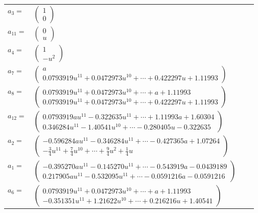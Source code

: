 \documentclass[1p]{elsarticle_modified}
\theoremstyle{definition}
\begin{document}
\begin{tabular}{m{7pt} m{180pt} m{7pt} m{180pt} }
\flushright $a_{3}=$&$\begin{pmatrix}1\\0\end{pmatrix}$ \\
\flushright $a_{11}=$&$\begin{pmatrix}0\\u\end{pmatrix}$ \\
\flushright $a_{4}=$&$\begin{pmatrix}1\\- u^2\end{pmatrix}$ \\
\flushright $a_{7}=$&$\begin{pmatrix}a\\0.0793919 u^{11}+0.0472973 u^{10}+\cdots+0.422297 u+1.11993\end{pmatrix}$ \\
\flushright $a_{8}=$&$\begin{pmatrix}0.0793919 u^{11}+0.0472973 u^{10}+\cdots+a+1.11993\\0.0793919 u^{11}+0.0472973 u^{10}+\cdots+0.422297 u+1.11993\end{pmatrix}$ \\
\flushright $a_{12}=$&$\begin{pmatrix}0.0793919 a u^{11}-0.322635 u^{11}+\cdots+1.11993 a+1.60304\\0.346284 u^{11}-1.40541 u^{10}+\cdots-0.280405 u-0.322635\end{pmatrix}$ \\
\flushright $a_{2}=$&$\begin{pmatrix}-0.596284 a u^{11}-0.346284 u^{11}+\cdots-0.427365 a+1.07264\\-\frac{3}{4} u^{11}+\frac{7}{4} u^{10}+\cdots+\frac{9}{4} u^2+\frac{1}{4} u\end{pmatrix}$ \\
\flushright $a_{1}=$&$\begin{pmatrix}-0.395270 a u^{11}-0.145270 u^{11}+\cdots-0.543919 a-0.0439189\\0.217905 a u^{11}-0.532095 u^{11}+\cdots-0.0591216 a-0.0591216\end{pmatrix}$ \\
\flushright $a_{6}=$&$\begin{pmatrix}0.0793919 u^{11}+0.0472973 u^{10}+\cdots+a+1.11993\\-0.351351 u^{11}+1.21622 u^{10}+\cdots+0.216216 u+1.40541\end{pmatrix}$ \\

\end{tabular}
\end{document}
